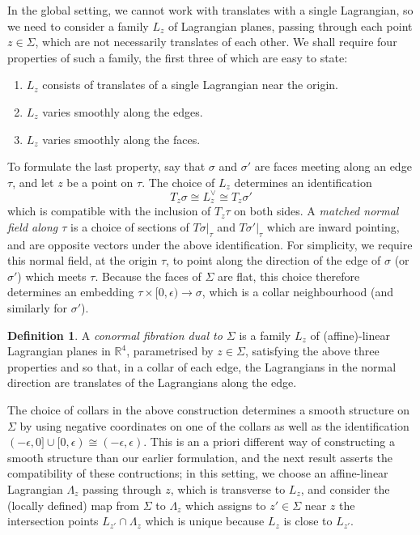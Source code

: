 \documentclass[11pt]{article}
\newcommand{\bR}{\mathbb{R}}
\theoremstyle{definition}
\newtheorem{definition}{Definition}
\begin{document}
In the global setting, we cannot work with translates with a single Lagrangian, so we need to consider a family $L_z$ of Lagrangian planes, passing through each point $z \in \Sigma$, which are not necessarily translates of each other. We shall require four properties of such a family, the first three of which are easy to state:
\begin{enumerate}
\item $L_z$ consists of translates of a single Lagrangian near the origin.
\item $L_z$ varies smoothly along the edges.
\item $L_z$ varies smoothly along the faces.
\end{enumerate}
To formulate the last property, say that $\sigma$ and $\sigma'$ are faces meeting along an edge $\tau$, and let $z$ be a point on $\tau$. The choice of $L_z$ determines an identification
\begin{equation*}
  T_z \sigma \cong L_z^\vee \cong T_z \sigma'
\end{equation*}
which is compatible with the inclusion of $T_z \tau$ on both sides. A \emph{matched normal field along $\tau$} is a choice of sections of $T \sigma|_{\tau}$ and $T \sigma'|_{\tau} $ which are inward pointing, and are opposite vectors under the above identification. For simplicity, we require this normal field, at the origin $\tau$, to point along the direction of the edge of $\sigma$ (or $\sigma'$) which meets $\tau$. Because the faces of $\Sigma$ are flat, this choice therefore determines an embedding $\tau \times [0,\epsilon) \to \sigma$, which is a collar neighbourhood (and similarly for $\sigma'$). 
   \begin{definition} \label{def:conormal_fibration_local}
   A \emph{conormal fibration dual to $\Sigma$} is a family $L_z$ of (affine)-linear Lagrangian planes in $\bR^4$, parametrised by $z \in \Sigma$, satisfying the above three properties and so that, in a collar of each edge, the Lagrangians in the normal direction are translates of the Lagrangians along the edge. 
 \end{definition}
 The choice of collars in the above construction determines a smooth structure on $\Sigma$ by using negative coordinates on one of the collars as well as the identification $(-\epsilon,0] \cup [0,\epsilon) \cong (-\epsilon,\epsilon) $. This is an a priori different way of constructing a smooth structure than our earlier formulation, and the next result asserts the compatibility of these contructions; in this setting, we choose an affine-linear Lagrangian $\Lambda_z$ passing through $z$, which is transverse to $L_z$, and consider the (locally defined) map from $\Sigma$ to $\Lambda_z$ which assigns to $z' \in \Sigma$ near $z$ the intersection points  $L_{z'} \cap \Lambda_z$ which is unique because $L_z$ is close to $L_{z'}$.
\end{document}
